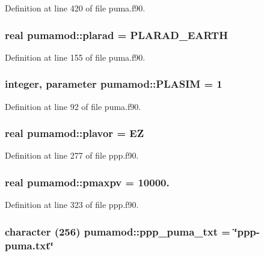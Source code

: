 \-Definition at line 420 of file puma.\-f90.

\hypertarget{classpumamod_a0c307462fbf87e3081b2a385e18d2aed}{
\subsubsection[{plarad}]{\setlength{\rightskip}{0pt plus 5cm}real {\bf pumamod\-::plarad} = \-P\-L\-A\-R\-A\-D\-\_\-\-E\-A\-R\-T\-H}}
\label{classpumamod_a0c307462fbf87e3081b2a385e18d2aed}


\-Definition at line 155 of file puma.\-f90.

\hypertarget{classpumamod_a6014a04a0c8a568ae850cff922ec8c36}{
\subsubsection[{\-P\-L\-A\-S\-I\-M}]{\setlength{\rightskip}{0pt plus 5cm}integer, parameter {\bf pumamod\-::\-P\-L\-A\-S\-I\-M} = 1}}
\label{classpumamod_a6014a04a0c8a568ae850cff922ec8c36}


\-Definition at line 92 of file puma.\-f90.

\hypertarget{classpumamod_aacb92e3b939fec35b06f04caded9fc93}{
\subsubsection[{plavor}]{\setlength{\rightskip}{0pt plus 5cm}real {\bf pumamod\-::plavor} = \-E\-Z}}
\label{classpumamod_aacb92e3b939fec35b06f04caded9fc93}


\-Definition at line 277 of file ppp.\-f90.

\hypertarget{classpumamod_a7171bac7e6ef17b935eac4171b1149ff}{
\subsubsection[{pmaxpv}]{\setlength{\rightskip}{0pt plus 5cm}real {\bf pumamod\-::pmaxpv} = 10000.}}
\label{classpumamod_a7171bac7e6ef17b935eac4171b1149ff}


\-Definition at line 323 of file ppp.\-f90.

\hypertarget{classpumamod_ae6491cb06d104f50f9803d15f195f951}{
\subsubsection[{ppp\-\_\-puma\-\_\-txt}]{\setlength{\rightskip}{0pt plus 5cm}character (256) {\bf pumamod\-::ppp\-\_\-puma\-\_\-txt} = \char`\"{}ppp-\/puma.\-txt\char`\"{}}}
\label{classpumamod_ae6491cb06d104f50f9803d15f195f951}


